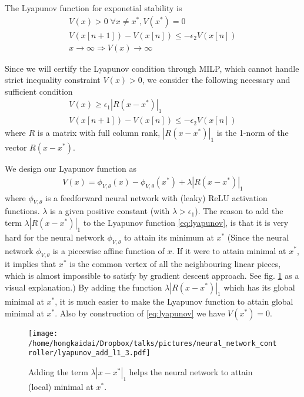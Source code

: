 \documentclass{article}
\begin{document}
The Lyapunov function for exponetial stability is
\begin{subequations}
\begin{align}
	V(x) > 0 \;\forall x\neq x^*, V(x^*) = 0\\
	V(x[n+1]) - V(x[n]) \le -\epsilon_2 V(x[n])\\
	x \rightarrow \infty \Rightarrow V(x)\rightarrow \infty
\end{align}
\end{subequations}
 
Since we will certify the Lyapunov condition through MILP, which cannot handle strict inequality constraint $V(x) > 0$, we consider the following necessary and sufficient condition
\begin{subequations}
\begin{align}
	V(x) \ge \epsilon_1 |R(x-x^*)|_1\\
	V(x[n+1]) - V(x[n]) \le -\epsilon_2V(x[n])
\end{align}
\label{eq:lyapunov_discrete}
\end{subequations}
where $R$ is a matrix with full column rank, $|R(x-x^*)|_1$ is the 1-norm of the vector $R(x-x^*)$.

We design our Lyapunov function as
\begin{align}
	V(x) = \phi_{V, \theta}(x) -\phi_{V, \theta}(x^*) + \lambda|R(x-x^*)|_1 \label{eq:lyapunov}
\end{align}
where $\phi_{V, \theta}$ is a feedforward neural network with (leaky) ReLU activation functions. $\lambda$ is a given positive constant (with $\lambda > \epsilon_1$). The reason to add the term  $\lambda|R(x-x^*)|_1$ to the Lyapunov function \eqref{eq:lyapunov}, is that it is very hard for the neural network $\phi_{V, \theta}$ to attain its minimum at $x^*$ (Since the neural network $\phi_{V, \theta}$ is a piecewise affine function of $x$. If it were to attain minimal at $x^*$, it implies that $x^*$ is the common vertex of all the neighbouring linear pieces, which is almost impossible to satisfy by gradient descent approach. See fig. \ref{fig:lyapunov_add_l1_3} as a visual explanation.) By adding the function $\lambda|R(x-x^*)|_1$ which has its global minimal at $x^*$, it is much easier to make the Lyapunov function to attain global minimal at $x^*$. Also by construction of \eqref{eq:lyapunov} we have $V(x^*) = 0$.
\begin{figure}
	\texttt{[image: /home/hongkaidai/Dropbox/talks/pictures/neural\_network\_controller/lyapunov\_add\_l1\_3.pdf]}
	\caption{Adding the term $\lambda |x-x^*|_1$ helps the neural network to attain (local) minimal at $x^*$.}
	\label{fig:lyapunov_add_l1_3}
\end{figure}
\end{document}
